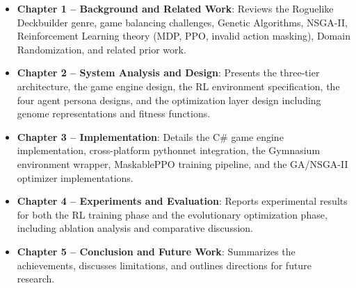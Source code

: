 \begin{itemize}
    \item \textbf{Chapter 1 -- Background and Related Work}: Reviews the Roguelike Deckbuilder genre, game balancing challenges, Genetic Algorithms, NSGA-II, Reinforcement Learning theory (MDP, PPO, invalid action masking), Domain Randomization, and related prior work.
    \item \textbf{Chapter 2 -- System Analysis and Design}: Presents the three-tier architecture, the game engine design, the RL environment specification, the four agent persona designs, and the optimization layer design including genome representations and fitness functions.
    \item \textbf{Chapter 3 -- Implementation}: Details the C\# game engine implementation, cross-platform pythonnet integration, the Gymnasium environment wrapper, MaskablePPO training pipeline, and the GA/NSGA-II optimizer implementations.
    \item \textbf{Chapter 4 -- Experiments and Evaluation}: Reports experimental results for both the RL training phase and the evolutionary optimization phase, including ablation analysis and comparative discussion.
    \item \textbf{Chapter 5 -- Conclusion and Future Work}: Summarizes the achievements, discusses limitations, and outlines directions for future research.
\end{itemize}
